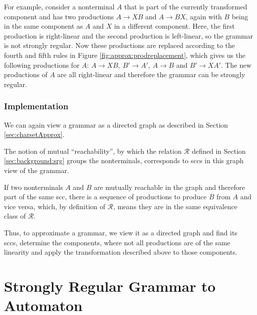 For example, consider a nonterminal $A$ that is part of the currently transformed component and has two productions $A \rightarrow X B$ and $A \rightarrow B X$, again with $B$ being in the same component as $A$ and $X$ in a different component. Here, the first production is right-linear and the second production is left-linear, so the grammar is not strongly regular.
Now these productions are replaced according to the fourth and fifth rules in Figure \ref{fig:approx:prodreplacement}, which gives us the following productions for $A$: $A \rightarrow XB,\ B' \rightarrow A',\ A \rightarrow B$ and $B' \rightarrow X A'$.
The new productions of $A$ are all right-linear and therefore the grammar can be strongly regular.

\subsubsection{Implementation}

We can again view a grammar as a directed graph as described in Section \ref{sec:charsetApprox}.

The notion of mutual \enquote{reachability}, by which the relation $\mathcal{R}$ defined in Section \ref{sec:background:srg} groups the nonterminals, corresponds to \acp{scc} in this graph view of the grammar.

If two nonterminals $A$ and $B$ are mutually reachable in the graph and therefore part of the same \ac{scc}, there is a sequence of productions to produce $B$ from $A$ and vice versa, which, by definition of $\mathcal{R}$, means they are in the same equivalence class of $\mathcal{R}$.

Thus, to approximate a grammar, we view it as a directed graph and find its \acp{scc}, determine the components, where not all productions are of the same linearity and apply the transformation described above to those components.

\begin{comment}

	
	Since a \ac{srg} generates a regular language and both steps in the transformation to a regular expression create an equivalent output from their input, the resulting regular expression accepts the language generated by the original \ac{srg}.
\end{comment}


\section{Strongly Regular Grammar to Automaton}\label{sec:nederhofAlgorithm}

